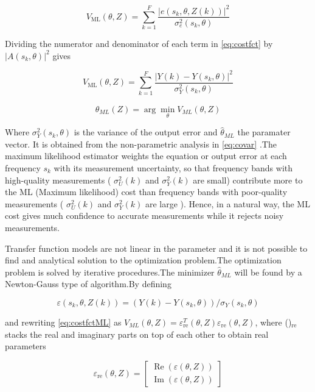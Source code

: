 \documentclass[a4paper,12pt]{article}
\numberwithin{equation}{section}
\begin{document}
\begin{equation}\label{eq:costfct}
V_{\mathrm{ML}}(\theta, Z)=\sum_{k=1}^{F} \frac{\left|e\left(s_{k}, \theta, Z(k)\right)\right|^{2}}{\sigma_{e}^{2}\left(s_{k}, \theta\right)}
\end{equation}

Dividing the numerator and denominator of each term in \ref{eq:costfct} by $\left|A\left(s_{k}, \theta\right)\right|^{2}$ gives

\begin{equation}\label{eq:costfctML}
V_{\mathrm{ML}}(\theta, Z)=\sum_{k=1}^{F} \frac{\left|Y(k)-Y\left(s_{k}, \theta\right)\right|^{2}}{\sigma_{Y}^{2}\left(s_{k}, \theta\right)}
\end{equation}

\begin{equation}
\hat{\theta}_{ML}(Z)=\arg  \min _{\theta} V_{ML}(\theta, Z)
\end{equation}


\noindent
Where $\sigma_{Y}^{2}(s_{k}, \theta)$ is the variance of the output error and $\hat{\theta}_{ML}$ the paramater vector. It is obtained from the non-parametric analysis in \ref{eq:covar} .The maximum likelihood estimator weights the equation or output error at each frequency $s_{k}$ with its measurement uncertainty, so that frequency bands with high-quality
measurements ( $\sigma_{U}^{2}(k)$ and $\sigma_{Y}^{2}(k)$ are small) contribute more to the ML (Maximum likelihood) cost than frequency bands with poor-quality measurements ( $\sigma_{U}^{2}(k)$ and $\sigma_{Y}^{2}(k)$ are large ).  Hence, in a natural way, the ML cost gives much confidence to accurate measurements while it rejects noisy measurements.

Transfer function models are not linear in the parameter and it is not possible to find and analytical solution to the optimization problem.The optimization problem is solved by iterative procedures.The minimizer $\hat{\theta}_{ML}$ will be found by a Newton-Gauss type of algorithm.By defining 

$$
\varepsilon\left(s_{k}, \theta, Z(k)\right)=\left(Y(k)-Y\left(s_{k}, \theta\right)\right) / \sigma_{Y}\left(s_{k}, \theta\right)
$$

and rewriting \ref{eq:costfctML} as $V_{ML}(\theta, Z)=\varepsilon_{\mathrm{re}}^{T}(\theta, Z) \varepsilon_{\mathrm{re}}(\theta, Z)$, where ()$_{\mathrm{re}}$ stacks the real and imaginary
parts on top of each other to obtain real parameters

$$
\varepsilon_{\mathrm{re}}(\theta, Z)=\left[\begin{array}{l}
\operatorname{Re}(\varepsilon(\theta, Z)) \\
\operatorname{Im}(\varepsilon(\theta, Z))
\end{array}\right]
$$
\end{document}

